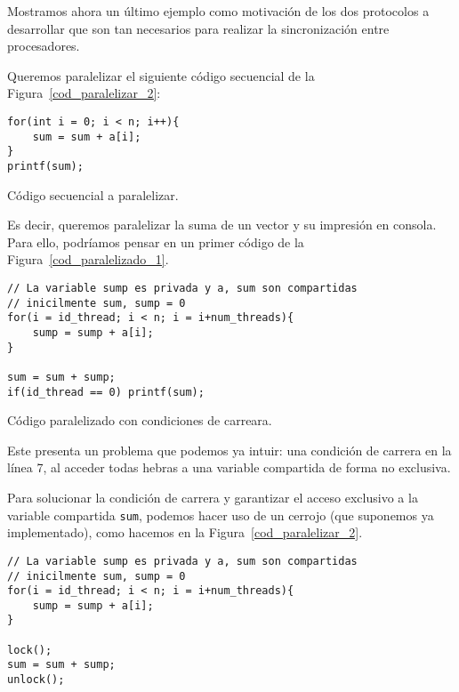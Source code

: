 Mostramos ahora un último ejemplo como motivación de los dos protocolos a desarrollar que son tan necesarios para realizar la sincronización entre procesadores.
\begin{ejemplo}
    Queremos paralelizar el siguiente código secuencial de la Figura~\ref{cod_paralelizar_2}:
\begin{listing}[H]
\centering
\begin{verbatim}
for(int i = 0; i < n; i++){
    sum = sum + a[i];
}
printf(sum);
\end{verbatim}
\caption{Código secuencial a paralelizar.}
\label{cod_paralelizar_2}
\end{listing}
Es decir, queremos paralelizar la suma de un vector y su impresión en consola. Para ello, podríamos pensar en un primer código de la Figura~\ref{cod_paralelizado_1}.
\begin{listing}[H]
\centering
\begin{verbatim}
// La variable sump es privada y a, sum son compartidas
// inicilmente sum, sump = 0
for(i = id_thread; i < n; i = i+num_threads){
    sump = sump + a[i];
}

sum = sum + sump;
if(id_thread == 0) printf(sum);
\end{verbatim}
\caption{Código paralelizado con condiciones de carreara.}
\label{cod_paralelizado_1}
\end{listing}

Este presenta un problema que podemos ya intuir: una condición de carrera en la línea 7, al acceder todas hebras a una variable compartida de forma no exclusiva.

Para solucionar la condición de carrera y garantizar el acceso exclusivo a la variable compartida \verb|sum|, podemos hacer uso de un cerrojo (que suponemos ya implementado), como hacemos en la Figura~\ref{cod_paralelizar_2}.
\begin{listing}[H]
\centering
\begin{verbatim}
// La variable sump es privada y a, sum son compartidas
// inicilmente sum, sump = 0
for(i = id_thread; i < n; i = i+num_threads){
    sump = sump + a[i];
}

lock();
sum = sum + sump;
unlock();


\end{verbatim}
\end{listing}
\end{ejemplo}
